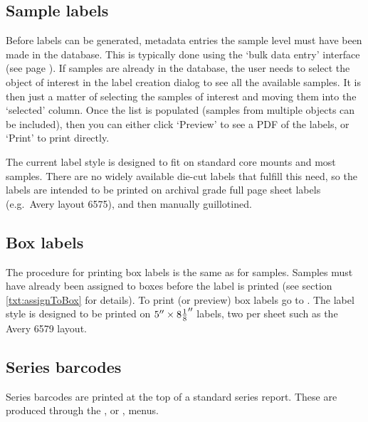 \subsection{Sample labels}
Before labels can be generated, metadata entries the sample level must have been made in the database.  This is typically done using the `bulk data entry' interface (see page \pageref{txt:bulkentry}).  If samples are already in the database, the user needs to select the object of interest in the label creation dialog to see all the available samples.  It is then just a matter of selecting the samples of interest and moving them into the `selected' column.  Once the list is populated (samples from multiple objects can be included), then you can either click `Preview' to see a PDF of the labels, or `Print' to print directly.

The current label style is designed to fit on standard core mounts and most samples.  There are no widely available die-cut labels that fulfill this need, so the labels are intended to be printed on archival grade full page sheet labels (e.g.\ Avery\textsuperscript{\textregistered} layout 6575), and then manually guillotined.  

\subsection{Box labels}
The procedure for printing box labels is the same as for samples.  Samples must have already been assigned to boxes before the label is printed (see section \ref{txt:assignToBox} for details).  To print (or preview) box labels go to .  The label style is designed to be printed on $5'' \times 8{1 \over 8}''$ labels, two per sheet such as the Avery\textsuperscript{\textregistered} 6579 layout.


\subsection{Series barcodes}

Series barcodes are printed at the top of a standard series report.  These are produced through the , or , menus.  


